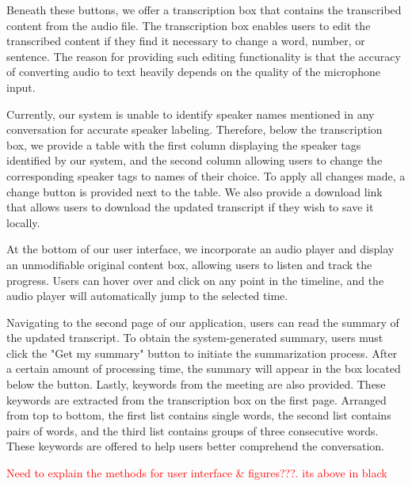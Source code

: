 Beneath these buttons, we offer a transcription box that contains the transcribed content from the audio file. The transcription box enables users to edit the transcribed content if they find it necessary to change a word, number, or sentence. The reason for providing such editing functionality is that the accuracy of converting audio to text heavily depends on the quality of the microphone input.

Currently, our system is unable to identify speaker names mentioned in any conversation for accurate speaker labeling. Therefore, below the transcription box, we provide a table with the first column displaying the speaker tags identified by our system, and the second column allowing users to change the corresponding speaker tags to names of their choice. To apply all changes made, a change button is provided next to the table. We also provide a download link that allows users to download the updated transcript if they wish to save it locally.

At the bottom of our user interface, we incorporate an audio player and display an unmodifiable original content box, allowing users to listen and track the progress. Users can hover over and click on any point in the timeline, and the audio player will automatically jump to the selected time.

Navigating to the second page of our application, users can read the summary of the updated transcript. To obtain the system-generated summary, users must click the "Get my summary" button to initiate the summarization process. After a certain amount of processing time, the summary will appear in the box located below the button. Lastly, keywords from the meeting are also provided. These keywords are extracted from the transcription box on the first page. Arranged from top to bottom, the first list contains single words, the second list contains pairs of words, and the third list contains groups of three consecutive words. These keywords are offered to help users better comprehend the conversation.

\textcolor{red}{Need to explain the methods for user interface \& figures???. its above in black }

\vspace{15mm}





